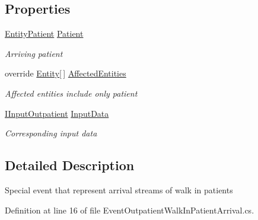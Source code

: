 \subsection*{Properties}
\begin{DoxyCompactItemize}
\item 
\hyperlink{class_general_health_care_elements_1_1_entities_1_1_entity_patient}{Entity\+Patient} \hyperlink{class_general_health_care_elements_1_1_department_models_1_1_outpatient_1_1_event_outpatient_walk_in_patient_arrival_a7500251a7629b12661856ebefabc8290}{Patient}
\begin{DoxyCompactList}\small\item\em Arriving patient \end{DoxyCompactList}\item 
override \hyperlink{class_simulation_core_1_1_h_c_c_m_elements_1_1_entity}{Entity}\mbox{[}$\,$\mbox{]} \hyperlink{class_general_health_care_elements_1_1_department_models_1_1_outpatient_1_1_event_outpatient_walk_in_patient_arrival_a532c73c9853a25576b357add15dc27b5}{Affected\+Entities}
\begin{DoxyCompactList}\small\item\em Affected entities include only patient \end{DoxyCompactList}\item 
\hyperlink{interface_general_health_care_elements_1_1_department_models_1_1_outpatient_1_1_i_input_outpatient}{I\+Input\+Outpatient} \hyperlink{class_general_health_care_elements_1_1_department_models_1_1_outpatient_1_1_event_outpatient_walk_in_patient_arrival_a1cba937630d5b01979b2907d969c7eb7}{Input\+Data}
\begin{DoxyCompactList}\small\item\em Corresponding input data \end{DoxyCompactList}\end{DoxyCompactItemize}


\subsection{Detailed Description}
Special event that represent arrival streams of walk in patients 



Definition at line 16 of file Event\+Outpatient\+Walk\+In\+Patient\+Arrival.\+cs.



